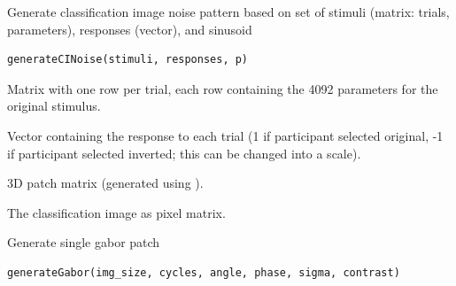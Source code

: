 \documentclass[letterpaper]{book}
\begin{document}
%
\begin{Description}
Generate classification image noise pattern based on set of stimuli (matrix: trials, parameters), responses (vector), and sinusoid
\end{Description}
%
\begin{Usage}
\begin{verbatim}
generateCINoise(stimuli, responses, p)
\end{verbatim}
\end{Usage}
%
\begin{Arguments}
\begin{ldescription}
\item[\code{stimuli}] Matrix with one row per trial, each row containing the 4092 parameters for the original stimulus.

\item[\code{responses}] Vector containing the response to each trial (1 if participant selected original, -1 if participant selected inverted;
this can be changed into a scale).

\item[\code{p}] 3D patch matrix (generated using ).
\end{ldescription}
\end{Arguments}
%
\begin{Value}
The classification image as pixel matrix.
\end{Value}
%
\begin{Examples}
\end{Examples}
%
\begin{Description}
Generate single gabor patch
\end{Description}
%
\begin{Usage}
\begin{verbatim}
generateGabor(img_size, cycles, angle, phase, sigma, contrast)
\end{verbatim}
\end{Usage}
\end{document}

